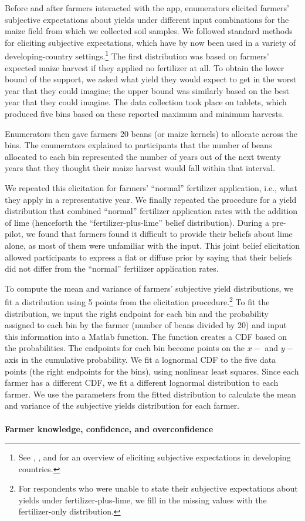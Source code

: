 \documentclass[12pt,letterpaper]{article}
\begin{document}
\noindent Before and after farmers interacted with the app, enumerators elicited farmers' subjective expectations about yields under different input combinations for the maize field from which we collected soil samples. We followed standard methods for eliciting subjective expectations, which have by now been used in a variety of developing-country settings.\footnote{See \citet{delavande_eliciting_2011}, \citet{delavande_measuring_2011}, and \citet{delavande_probabilistic_2014} for an overview of eliciting subjective expectations in developing countries.} The first distribution was based on farmers' expected maize harvest if they applied no fertilizer at all. To obtain the lower bound of the support, we asked what yield they would expect to get in the worst year that they could imagine; the upper bound was similarly based on the best year that they could imagine. The data collection took place on tablets, which produced five bins based on these reported maximum and minimum harvests.

Enumerators then gave farmers 20 beans (or maize kernels) to allocate across the bins. The enumerators explained to participants that the number of beans allocated to each bin represented the number of years out of the next twenty years that they thought their maize harvest would fall within that interval. 

We repeated this elicitation for farmers' ``normal'' fertilizer application, i.e., what they apply in a representative year. We finally repeated the procedure for a yield distribution that combined ``normal'' fertilizer application rates with the addition of lime (henceforth the ``fertilizer-plus-lime'' belief distribution). During a pre-pilot, we found that farmers found it difficult to provide their beliefs about lime alone, as most of them were unfamiliar with the input. This joint belief elicitation allowed participants to express a flat or diffuse prior by saying that their beliefs did not differ from the ``normal'' fertilizer application rates.

To compute the mean and variance of farmers' subjective yield distributions, we fit a distribution using 5 points from the elicitation procedure.\footnote{For respondents who were unable to state their subjective expectations about yields under fertilizer-plus-lime, we fill in the missing values with the fertilizer-only distribution.} To fit the distribution, we input the right endpoint for each bin and the probability assigned to each bin by the farmer (number of beans divided by 20) and input this information into a Matlab function. The function creates a CDF based on the probabilities. The endpoints for each bin become points on the $x-$ and $y-$axis in the cumulative probability. We fit a lognormal CDF to the five data points (the right endpoints for the bins), using nonlinear least squares. Since each farmer has a different CDF, we fit a different lognormal distribution to each farmer. We use the parameters from the fitted distribution to calculate the mean and variance of the subjective yields distribution for each farmer.\\
\\
\noindent \textbf{Farmer knowledge, confidence, and overconfidence}
\end{document}
